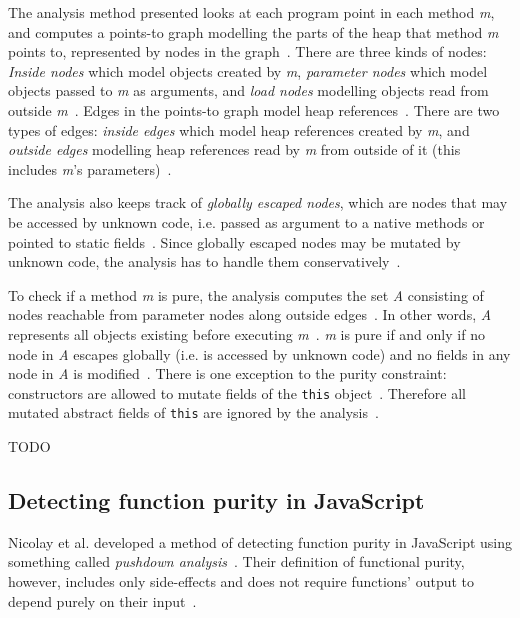 \documentclass[a4paper,12pt]{article}
\begin{document}
The analysis method presented looks at each program point in each method \textit{m}, and computes a points-to graph modelling the parts of the heap that method \textit{m} points to, represented by nodes in the graph~\cite{salcianu}. There are three kinds of nodes: \textit{Inside nodes} which model objects created by \textit{m}, \textit{parameter nodes} which model objects passed to \textit{m} as arguments, and \textit{load nodes} modelling objects read from outside \textit{m}~\cite{salcianu}. Edges in the points-to graph model heap references~\cite{salcianu}. There are two types of edges: \textit{inside edges} which model heap references created by \textit{m}, and \textit{outside edges} modelling heap references read by \textit{m} from outside of it (this includes \textit{m}'s parameters)~\cite{salcianu}.


The analysis also keeps track of \textit{globally escaped nodes}, which are nodes that may be accessed by unknown code, i.e. passed as argument to a native methods or pointed to static fields~\cite{salcianu}. Since globally escaped nodes may be mutated by unknown code, the analysis has to handle them conservatively~\cite{salcianu}.

To check if a method \textit{m} is pure, the analysis computes the set \textit{A} consisting of nodes reachable from parameter nodes along outside edges~\cite{salcianu}. In other words, \textit{A} represents all objects existing before executing \textit{m}~\cite{salcianu}. \textit{m} is pure if and only if no node in \textit{A} escapes globally (i.e. is accessed by unknown code) and no fields in any node in \textit{A} is modified~\cite{salcianu}. There is one exception to the purity constraint: constructors are allowed to mutate fields of the \texttt{this} object~\cite{salcianu}. Therefore all mutated abstract fields of \texttt{this} are ignored by the analysis~\cite{salcianu}.

TODO

\subsection{Detecting function purity in JavaScript}
Nicolay et al. developed a method of detecting function purity in JavaScript using something called \textit{pushdown analysis}~\cite{purity-in-javascript}. Their definition of functional purity, however, includes only side-effects and does not require functions' output to depend purely on their input~\cite{purity-in-javascript}.
\end{document}
